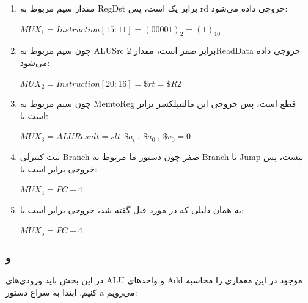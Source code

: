 \begin{enumerate}
	\item 
	مقدار سیم مربوط به RegDst برابر یک است، پس rd خروجی داده می‌شود:
	\setLTR
	
	$MUX_1 = Instruction[15:11]=(00001)_2 = (1)_{10}$
	
	\setRTL
	
	\item 
	چون سیم مربوط به ALUSrc برابر صفر است، مقدار 2ReadData خروجی داده می‌شود:
	\setLTR
	
	$MUX_2 = Instruction[20:16]= \$rt = \$R2 $
	
	\setRTL	
	
	\item 
	چون سیم مربوط به MemtoReg قطع است، پس خروجی این مالتیپلکسر برابر است با:
	\setLTR
	
	$MUX_3 = ALUResult =slt \ \ \$a_t \ ,\ \$a_0 \ , \ \$v_0 = 0$
	
	\setRTL	
	
	\item 
	بیت کنترلی Branch صفر چون دستور ما مربوط به Branch یا Jump نیست، پس خروجی برابر است با:
	\setLTR
	
	$MUX_4 = PC + 4$
	
	\setRTL	
	
	\item 
	به همان دلیلی که در مورد قبل گفته شد، خروجی برابر است با:
	\setLTR
	
	$MUX_5 = PC + 4$
	
	\setRTL	
\end{enumerate}

\subsubsection*{و}

در این بخش باید ورودی‌های ALU و واحدهای Add موجود در این معماری را محاسبه کنیم. ابتدا به سراغ دستور a می‌رویم:

